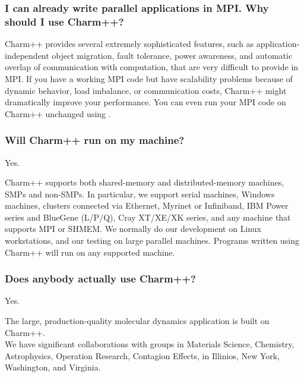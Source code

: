 \subsubsection{I can already write parallel applications in MPI. Why should I use Charm++?}

Charm++ provides several extremely sophisticated features, such as
application-independent object migration, fault tolerance, power
awareness, and automatic overlap of communication with computation,
that are very difficult to provide in MPI.  If you have a working MPI
code but have scalability problems because of dynamic behavior, load
imbalance, or communication costs, Charm++ might dramatically improve
your performance. You can even run your MPI code on Charm++ unchanged
using
.

\subsubsection{Will Charm++ run on my machine?}

Yes.

Charm++ supports both shared-memory and distributed-memory machines,
SMPs and non-SMPs. In particular, we support serial machines, Windows
machines, clusters connected via Ethernet, Myrinet or Infiniband, IBM
Power series and BlueGene (L/P/Q), Cray XT/XE/XK series, and any machine that
supports MPI or SHMEM. We normally do our development on Linux
workstations, and our testing on large parallel machines. Programs
written using Charm++ will run on any supported machine.


\subsubsection{Does anybody actually use Charm++?}

Yes.

The large, production-quality molecular dynamics application 
is built on Charm++.\\
We have significant collaborations with groups in Materials Science,
Chemistry, Astrophysics, Operation Research, Contagion Effects, in Illinios, New York, Washington, and Virginia.

